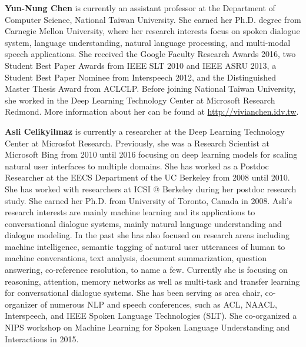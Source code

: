 \begin{bio}
  {\bfseries Yun-Nung Chen} is currently an assistant professor at the Department of Computer Science, National Taiwan University. She earned her Ph.D. degree from Carnegie Mellon University, where her research interests focus on spoken dialogue system, language understanding, natural language processing, and multi-modal speech applications. She received the Google Faculty Research Awards 2016, two Student Best Paper Awards from IEEE SLT 2010 and IEEE ASRU 2013, a Student Best Paper Nominee from Interspeech 2012, and the Distinguished Master Thesis Award from ACLCLP. Before joining National Taiwan University, she worked in the Deep Learning Technology Center at Microsoft Research Redmond. More information about her can be found at \url{http://vivianchen.idv.tw}.

  {\bfseries Asli Celikyilmaz} is currently a researcher at the Deep Learning Technology Center at Microsfot Research. Previously, she was a Research Scientist at Microsoft Bing from 2010 until 2016 focusing on deep learning models for scaling natural user interfaces to multiple domains. She has worked as a Postdoc Researcher at the EECS Department of the UC Berkeley from 2008 until 2010. She has worked with researchers at ICSI @ Berkeley during her postdoc research study. She earned her Ph.D. from University of Toronto, Canada in 2008. Asli’s research interests are mainly machine learning and its applications to conversational dialogue systems, mainly natural language understanding and dialogue modeling. In the past she has also focused on research areas including machine intelligence, semantic tagging of natural user utterances of human to machine conversations, text analysis, document summarization, question answering, co-reference resolution, to name a few. Currently she is focusing on reasoning, attention, memory networks as well as multi-task and transfer learning for conversational dialogue systems. She has been serving as area chair, co-organizer of numerous NLP and speech conferences, such as ACL, NAACL, Interspeech, and IEEE Spoken Language Technologies (SLT). She co-organized a NIPS workshop on Machine Learning for Spoken Language Understanding and Interactions in 2015.


\end{bio}

